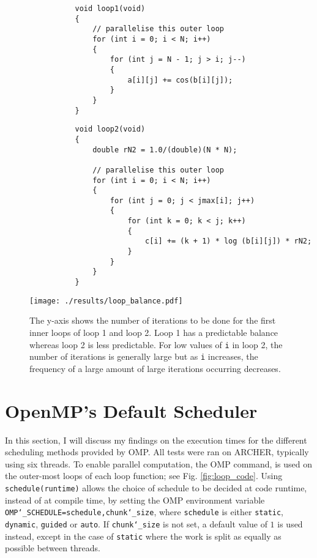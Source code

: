 \documentclass[11pt, a4paper]{article}
\begin{document}
		\begin{figure*}
			\begin{verbatim}
				void loop1(void)
				{
					// parallelise this outer loop
					for (int i = 0; i < N; i++)
					{
						for (int j = N - 1; j > i; j--)
						{
							a[i][j] += cos(b[i][j]);
						}
					}
				}
			\end{verbatim}
			
			\begin{verbatim}
				void loop2(void)
				{
					double rN2 = 1.0/(double)(N * N);
	
					// parallelise this outer loop
					for (int i = 0; i < N; i++)
					{
						for (int j = 0; j < jmax[i]; j++)
						{
							for (int k = 0; k < j; k++)
							{
								c[i] += (k + 1) * log (b[i][j]) * rN2;
							}
						}
					}
				}
			\end{verbatim}
			\caption{The two benchmark loops being used. Both loops provide an unbalanced workload.}
			\label{fig:loop_code}
		\end{figure*}
	
		\begin{figure}
			\centering
			\texttt{[image: ./results/loop\_balance.pdf]}
			\caption{The y-axis shows the number of iterations to be done for the first inner loops of loop 1 and loop 2. Loop 1 has a predictable balance whereas loop 2 is less predictable. For low values of \texttt{i} in loop 2, the number of iterations is generally large but as \texttt{i} increases, the frequency of a large amount of large iterations occurring decreases.}
			\label{fig:loop_balance}
		\end{figure}
			
	\section{OpenMP's Default Scheduler}
		In this section, I will discuss my findings on the execution times for the different scheduling methods provided by OMP. All tests were ran on ARCHER, typically using six threads. To enable parallel computation, the OMP command,  \noindent is used on the outer-most loops of each loop function; see Fig. \ref{fig:loop_code}. Using \texttt{schedule(runtime)} allows the choice of schedule to be decided at code runtime, instead of at compile time, by setting the OMP environment variable \texttt{OMP\char`_SCHEDULE=schedule,chunk\char`_size}, where \texttt{schedule} is either \texttt{static}, \texttt{dynamic}, \texttt{guided}  or \texttt{auto}. If \texttt{chunk\char`_size} is not set, a default value of $1$ is used instead, except in the case of \texttt{static} where the work is split as equally as possible between threads.
	
\end{document}

